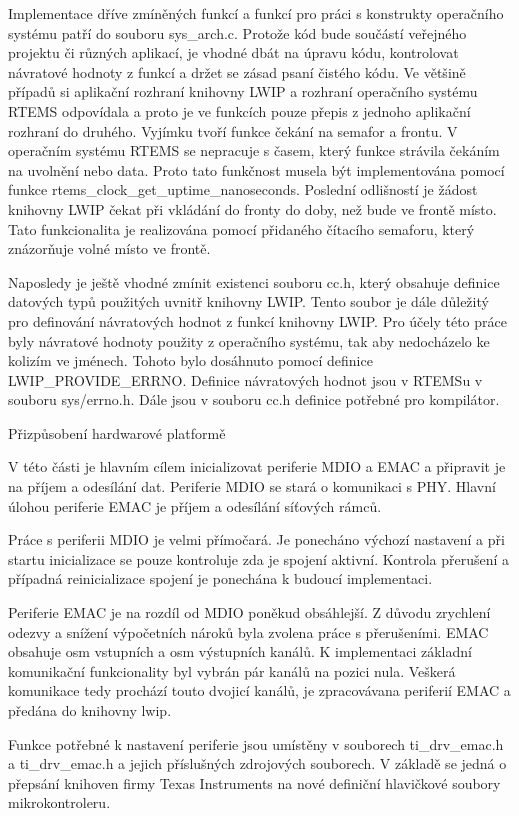 Implementace dříve zmíněných funkcí a funkcí pro práci s konstrukty operačního systému patří do souboru sys\_arch.c. Protože kód bude součástí veřejného projektu či různých aplikací, je vhodné dbát na úpravu kódu, kontrolovat návratové hodnoty z funkcí a držet se zásad psaní čistého kódu. Ve většině případů si aplikační rozhraní knihovny LWIP a rozhraní operačního systému RTEMS odpovídala a proto je ve funkcích pouze přepis z jednoho aplikační rozhraní do druhého. Vyjímku tvoří funkce čekání na semafor a frontu. V operačním systému RTEMS se nepracuje s časem, který funkce strávila čekáním na uvolnění nebo data. Proto tato funkčnost musela být implementována pomocí funkce rtems\_clock\_get\_uptime\_nanoseconds. Poslední odlišností je žádost knihovny LWIP čekat při vkládání do fronty do doby, než bude ve frontě místo. Tato funkcionalita je realizována pomocí přidaného čítacího semaforu, který znázorňuje volné místo ve frontě.

Naposledy je ještě vhodné zmínit existenci souboru cc.h, který obsahuje definice datových typů použitých uvnitř knihovny LWIP. Tento soubor je dále důležitý pro definování návratových hodnot z funkcí knihovny LWIP. Pro účely této práce byly návratové hodnoty použity z operačního systému, tak aby nedocházelo ke kolizím ve jménech. Tohoto bylo dosáhnuto pomocí definice LWIP\_PROVIDE\_ERRNO. Definice návratových hodnot jsou v RTEMSu v souboru sys/errno.h. Dále jsou v souboru cc.h definice potřebné pro kompilátor.

\secc Přizpůsobení hardwarové platformě

V této části je hlavním cílem inicializovat periferie MDIO a EMAC a připravit je na příjem a odesílání dat. Periferie MDIO se stará o komunikaci s PHY. Hlavní úlohou periferie EMAC je příjem a odesílání síťových rámců. 

Práce s periferii MDIO je velmi přímočará. Je ponecháno výchozí nastavení a při startu inicializace se pouze kontroluje zda je spojení aktivní. Kontrola přerušení a případná reinicializace spojení je ponechána k budoucí implementaci.

Periferie EMAC je na rozdíl od MDIO poněkud obsáhlejší. Z důvodu zrychlení odezvy a snížení výpočetních nároků byla zvolena práce s přerušeními. EMAC obsahuje osm vstupních a osm výstupních kanálů. K implementaci základní komunikační funkcionality byl vybrán pár kanálů na pozici nula. Veškerá komunikace tedy prochází touto dvojicí kanálů, je zpracovávana periferií EMAC a předána do knihovny lwip.

Funkce potřebné k nastavení periferie jsou umístěny v souborech ti\_drv\_emac.h a ti\_drv\_emac.h a jejich příslušných zdrojových souborech. V základě se jedná o přepsání knihoven firmy Texas Instruments na nové definiční hlavičkové soubory mikrokontroleru.


